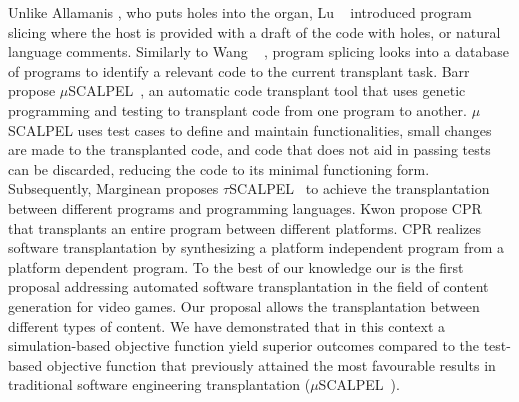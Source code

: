 Unlike Allamanis \etal, who puts holes into the organ, Lu \etal~\cite{lu2018program} introduced program slicing where the host is provided with a draft of the code with holes, or natural language comments. Similarly to Wang \etal~\cite{wang2016hunter} , program splicing looks into a database of programs to identify a relevant code to the current transplant task. 
Barr \etal propose $\mu$SCALPEL~\cite{barr2015automated}, an automatic code transplant tool that uses genetic programming and testing to transplant code from one program to another. 
$\mu$SCALPEL uses test cases to define and maintain functionalities, small changes are made to the transplanted code, and code that does not aid in passing tests can be discarded, reducing the code to its minimal functioning form. 
Subsequently, Marginean \etal proposes $\tau$SCALPEL~\cite{marginean2021automated} to achieve the transplantation between different programs and programming languages. 
Kwon \etal propose CPR~\cite{kwon2017cpr} that transplants an entire program between different platforms. CPR realizes software transplantation by synthesizing a platform independent program from a platform dependent program. 
To the best of our knowledge our is the first proposal addressing automated software transplantation in the field of content generation for video games. Our proposal allows the transplantation between different types of content. We have demonstrated that in this context a simulation-based objective function yield superior outcomes compared to the test-based objective function that previously attained the most favourable results in traditional software engineering transplantation ($\mu$SCALPEL~\cite{marginean2021automated}).

